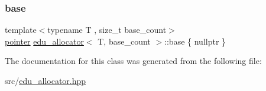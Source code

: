 \subsubsection{\texorpdfstring{base}{base}}
{\footnotesize\ttfamily template$<$typename T , size\+\_\+t base\+\_\+count$>$ \\
\hyperlink{classedu__allocator_a735857fd1d42cae69aef990a62e597cf}{pointer} \hyperlink{classedu__allocator}{edu\+\_\+allocator}$<$ T, base\+\_\+count $>$\+::base \{ nullptr \}}



The documentation for this class was generated from the following file\+:\begin{DoxyCompactItemize}
\item 
src/\hyperlink{edu__allocator_8hpp}{edu\+\_\+allocator.\+hpp}\end{DoxyCompactItemize}
